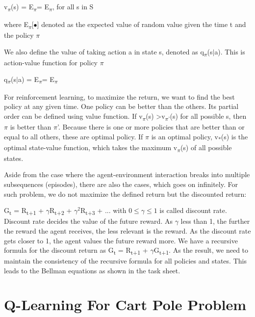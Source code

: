 \documentclass[11pt]{article}
\begin{document}
v\textsubscript{$\pi$}(s) = E\textsubscript{$\pi$}\big[ G\textsubscript{$t$}|S\textsubscript{t}=s \big] = E\textsubscript{$\pi$}\big[ $\sum_{k=0}^{\infty} \gamma^{k} R\textsubscript{t+k+1} | S\textsubscript{t}=s$ \big], for all s in S

where E\textsubscript{$\pi$}[$\bullet$] denoted as the expected value of random value given the time t and the policy $\pi$

We also define the value of taking action a in state s, denoted as q\textsubscript{$\pi$}(s$\vert$a).
This is action-value function for policy $\pi$

q\textsubscript{$\pi$}(s$\vert$a) = E\textsubscript{$\pi$}\big[ G\textsubscript{$t$}|S\textsubscript{t}=s,  A\textsubscript{t}=a \big] = E\textsubscript{$\pi$}\big[ $\sum_{k=0}^{\infty} \gamma^{k} R\textsubscript{t+k+1} | S\textsubscript{t}=s, A\textsubscript{t}=a $ \big]

For reinforcement learning, to maximize the return, we want to find the best policy at any given time. One policy can be better than the others. Its partial order can be defined using value function. If v\textsubscript{$\pi$}(s) >v\textsubscript{$\pi$'}(s) for all possible s, then $\pi$ is better than $\pi$'. Because there is one or more policies that are better than or equal to all others, these are optimal policy. If $\pi$ is an optimal policy, v\textsubscript{*}(s) is the optimal state-value function, which takes the maximum v\textsubscript{$\pi$}(s) of all possible states.

Aside from the case where the agent-environment interaction breaks into multiple subsequences (episodes), there are also the cases, which goes on infinitely. For such problem, we do not maximize the defined return but the discounted return:

G\textsubscript{t} = R\textsubscript{t+1} + $\gamma$R\textsubscript{t+2} + $\gamma^{2}$R\textsubscript{t+3} + ... with $0 \leq \gamma \leq 1$ is called discount rate. Discount rate decides the value of the future reward. As $\gamma$ less than 1, the further the reward the agent receives, the less relevant is the reward. As the discount rate gets closer to 1, the agent values the future reward more. We have a recursive formula for the discount return as G\textsubscript{t} = R\textsubscript{t+1} + $\gamma$G\textsubscript{t+1}. As the result, we need to maintain the consistency of the recursive formula for all policies and states. This leads to the Bellman equations as shown in the task sheet.


\section{Q-Learning For Cart Pole Problem}
\end{document}
